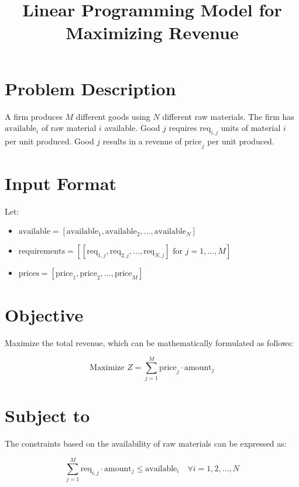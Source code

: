\documentclass{article}
\begin{document}
\title{Linear Programming Model for Maximizing Revenue}
\author{}
\date{}
\maketitle

\section*{Problem Description}

A firm produces \( M \) different goods using \( N \) different raw materials. The firm has \( \text{available}_i \) of raw material \( i \) available. Good \( j \) requires \( \text{req}_{i,j} \) units of material \( i \) per unit produced. Good \( j \) results in a revenue of \( \text{price}_j \) per unit produced.

\section*{Input Format}

Let:
\begin{itemize}
    \item \( \text{available} = [\text{available}_1, \text{available}_2, \ldots, \text{available}_N] \)
    \item \( \text{requirements} = \left[ \left[ \text{req}_{1,j}, \text{req}_{2,j}, \ldots, \text{req}_{N,j} \right] \text{ for } j = 1, \ldots, M \right] \)
    \item \( \text{prices} = [\text{price}_1, \text{price}_2, \ldots, \text{price}_M] \)
\end{itemize}

\section*{Objective}

Maximize the total revenue, which can be mathematically formulated as follows:

\[
\text{Maximize } Z = \sum_{j=1}^{M} \text{price}_j \cdot \text{amount}_j
\]

\section*{Subject to}

The constraints based on the availability of raw materials can be expressed as:

\[
\sum_{j=1}^{M} \text{req}_{i,j} \cdot \text{amount}_j \leq \text{available}_i \quad \forall i = 1, 2, \ldots, N
\]
\end{document}

